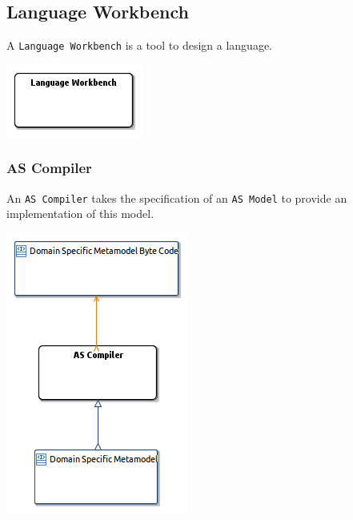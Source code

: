 \documentclass{gemoc} %
\begin{document}
\subsection{Language Workbench}
\label{sec:Language_Workbench}
A \texttt{Language Workbench} is a tool to design a language.
\begin{center}
\includegraphics*[trim=0.0cm 0.0cm 0cm 0.0cm, clip=true]{../images/generated/Generated_Language_Workbench.png}
\end{center}



\subsubsection{AS Compiler}
\label{sec:AS_Compiler}
An \texttt{AS Compiler} takes the specification of an \texttt{AS Model} to provide an implementation of this model.
\begin{center}
\includegraphics*[trim=0.0cm 0.0cm 0cm 0.0cm, clip=true]{../images/generated/Generated_AS_Compiler.png}
\end{center}
\end{document}
